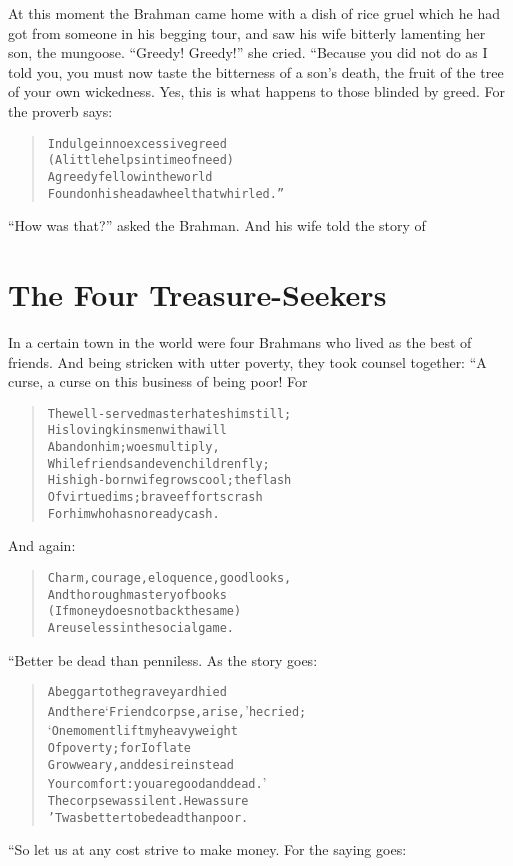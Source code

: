 \documentclass[article, twoside, 14pt]{memoir}
\renewenvironment{verbatim}{%
\begin{quote}%
\vskip -10pt%
\begin{alltt}\normalfont\large}{\end{alltt}%
\end{quote}%
\vskip -10pt
} %
\begin{document}
At this moment the Brahman came home with a dish of rice gruel
which he had got from someone in his begging tour, and saw his wife
bitterly lamenting her son, the mungoose. ``Greedy! Greedy!''
she cried. “Because you did not do as I told you, you must now
taste the bitterness of a son's death, the fruit of the tree of
your own wickedness. Yes, this is what happens to those blinded by
greed. For the proverb says:

\begin{verbatim}
Indulge in no excessive greed
(A little helps in time of need){\textemdash}
A greedy fellow in the world
Found on his head a wheel that whirled.”
\end{verbatim}
``How was that?'' asked the Brahman. And his wife told the story
of

\chapter{The Four Treasure-Seekers}

\label{s81}

In a certain town in the world were four Brahmans who lived as the
best of friends. And being stricken with utter poverty, they took
counsel together: “A curse, a curse on this business of being poor!
For

\begin{verbatim}
The well-served master hates him still;
His loving kinsmen with a will
Abandon him; woes multiply,
While friends and even children fly;
His high-born wife grows cool; the flash
Of virtue dims; brave efforts crash{\textemdash}
For him who has no ready cash.
\end{verbatim}
And again:

\begin{verbatim}
Charm, courage, eloquence, good looks,
And thorough mastery of books
(If money does not back the same)
Are useless in the social game.
\end{verbatim}
“Better be dead than penniless. As the story goes:

\begin{verbatim}
A beggar to the graveyard hied
And there ‘Friend corpse, arise,’ he cried;
‘One moment lift my heavy weight
Of poverty; for I of late
Grow weary, and desire instead
Your comfort: you are good and dead.’
The corpse was silent. He was sure
'Twas better to be dead than poor.
\end{verbatim}
“So let us at any cost strive to make money. For the saying goes:
\end{document}
